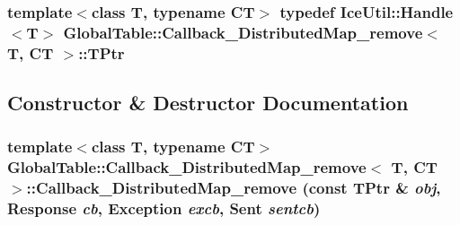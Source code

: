 \label{class_global_table_1_1_callback___distributed_map__remove_a4f807ae9e10f4f3fe1b7f7f677bb5379}
\hypertarget{class_global_table_1_1_callback___distributed_map__remove_a4b1ddb2d17252cf60a112c6f5cf47cba}{
\subsubsection[{TPtr}]{\setlength{\rightskip}{0pt plus 5cm}template$<$class T, typename CT$>$ typedef IceUtil::Handle$<$T$>$ {\bf GlobalTable::Callback\_\-DistributedMap\_\-remove}$<$ T, CT $>$::{\bf TPtr}}}
\label{class_global_table_1_1_callback___distributed_map__remove_a4b1ddb2d17252cf60a112c6f5cf47cba}


\subsection{Constructor \& Destructor Documentation}
\hypertarget{class_global_table_1_1_callback___distributed_map__remove_a72af11d1b8111f72c12130a587e01072}{
\subsubsection[{Callback\_\-DistributedMap\_\-remove}]{\setlength{\rightskip}{0pt plus 5cm}template$<$class T, typename CT$>$ {\bf GlobalTable::Callback\_\-DistributedMap\_\-remove}$<$ T, CT $>$::{\bf Callback\_\-DistributedMap\_\-remove} (const {\bf TPtr} \& {\em obj}, \/  {\bf Response} {\em cb}, \/  {\bf Exception} {\em excb}, \/  {\bf Sent} {\em sentcb})}}
\label{class_global_table_1_1_callback___distributed_map__remove_a72af11d1b8111f72c12130a587e01072}


